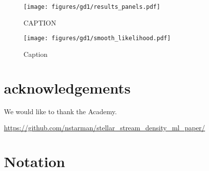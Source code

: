 \documentclass[twocolumn]{aastex631}
\begin{document}
            \begin{figure*}[h]
                \centering
                \texttt{[image: figures/gd1/results\_panels.pdf]}
                \caption{CAPTION}
                \label{fig:gd1-results-panels}
            \end{figure*}
    
            \begin{figure*}
                \centering
                \texttt{[image: figures/gd1/smooth\_likelihood.pdf]}
                \caption{Caption}
                \label{fig:gd1-heatmap}
            \end{figure*}





\section{acknowledgements}

    We would like to thank the Academy.

    \url{https://github.com/nstarman/stellar_stream_density_ml_paper/}




\appendix

\section{Notation} \label{app:notation}
\end{document}

